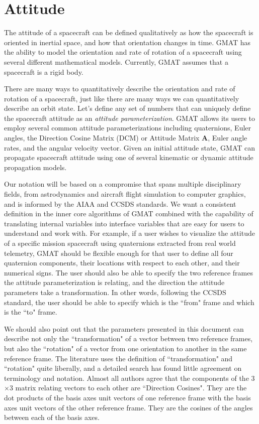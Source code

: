 \section{Attitude} \label{Ch:Attitude}
The attitude of a spacecraft can be defined qualitatively as how the spacecraft
is oriented in inertial space, and how that orientation changes in time. GMAT
has the ability to model the orientation and rate of rotation of a spacecraft
using several different mathematical models.  Currently, GMAT assumes that a
spacecraft is a rigid body.

There are many ways to quantitatively describe the orientation and rate of
rotation of a spacecraft, just like there are many ways we can quantitatively
describe an orbit state. Let's define any set of numbers that can uniquely
define the spacecraft attitude as an \emph{attitude parameterization}.  GMAT
allows its users to employ several common attitude parameterizations including
quaternions, Euler angles, the Direction Cosine Matrix (DCM) or Attitude Matrix
\textbf{A}, Euler angle rates, and the angular velocity vector. Given an initial
attitude state, GMAT can propagate spacecraft attitude using one of several
kinematic or dynamic attitude propagation models.

Our notation will be based on a compromise that spans multiple disciplinary
fields, from astrodynamics and aircraft flight simulation to computer graphics,
and is informed by the AIAA and CCSDS standards.  We want a consistent
definition in the inner core algorithms of GMAT combined with the capability of
translating internal variables into interface variables that are easy for users
to understand and work with.  For example, if a user wishes to visualize the
attitude of a specific mission spacecraft using quaternions extracted from real
world telemetry, GMAT should be flexible enough for that user to define all four
quaternion components, their locations with respect to each other, and their
numerical signs.  The user should also be able to specify the two reference
frames the attitude parameterization is relating, and the direction the attitude
parameters take a transformation.  In other words, following the CCSDS standard,
the user should be able to specify which is the ``from" frame and which is the
``to" frame.

We should also point out that the parameters presented in this document can
describe not only the ``transformation" of a vector between two reference frames,
but also the ``rotation" of a vector from one orientation to another in the same
reference frame.  The literature uses the definition of ``transformation" and
``rotation" quite liberally, and a detailed search has found little agreement on
terminology and notation.  Almost all authors agree that the components of the
3$\times$3 matrix relating vectors to each other are ``Direction Cosines".  They
are the dot products of the basis axes unit vectors of one reference frame with
the basis axes unit vectors of the other reference frame.  They are the cosines
of the angles between each of the basis axes.

